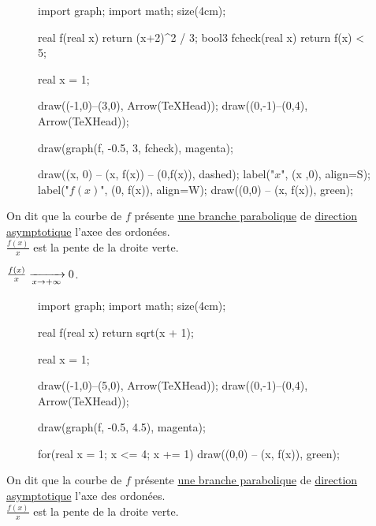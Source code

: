 \begin{multicols}{2}
	\begin{figure}[H]
		\centering
		\begin{asy}
			import graph;
			import math;
			size(4cm);

			real f(real x) { return (x+2)^2 / 3; }
			bool3 fcheck(real x) { return f(x) < 5; }

			real x = 1;

			draw((-1,0)--(3,0), Arrow(TeXHead));
			draw((0,-1)--(0,4), Arrow(TeXHead));

			draw(graph(f, -0.5, 3, fcheck), magenta);

			draw((x, 0) -- (x, f(x)) -- (0,f(x)), dashed);
			label("$x$", (x ,0), align=S);
			label("$f(x)$", (0, f(x)), align=W);
			draw((0,0) -- (x, f(x)), green);
		\end{asy}
	\end{figure}

	On dit que la courbe de $f$ présente \underline{une branche parabolique} de \underline{direction asymptotique} l'axee des ordonées.\\[1mm]

	$\frac{f(x)}{x}$ est la pente de la droite verte.
\end{multicols}

$\frac{f(x)}{x} \xrightarrow[x\to +\infty]{} 0$.

\begin{multicols}{2}
	\begin{figure}[H]
		\centering
		\begin{asy}
			import graph;
			import math;
			size(4cm);

			real f(real x) { return sqrt(x + 1); }

			real x = 1;

			draw((-1,0)--(5,0), Arrow(TeXHead));
			draw((0,-1)--(0,4), Arrow(TeXHead));

			draw(graph(f, -0.5, 4.5), magenta);

			for(real x = 1; x <= 4; x += 1) {
				draw((0,0) -- (x, f(x)), green);
			}
		\end{asy}
	\end{figure}

	On dit que la courbe de $f$ présente \underline{une branche parabolique} de \underline{direction asymptotique} l'axe des ordonées.\\[1mm]

	$\frac{f(x)}{x}$ est la pente de la droite verte.
\end{multicols}

